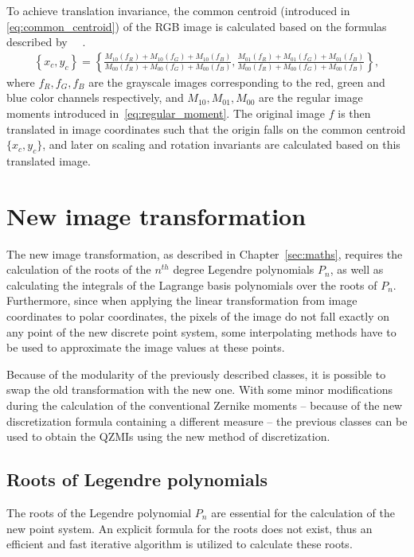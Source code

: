 To achieve translation invariance, the common centroid (introduced in \eqref{eq:common_centroid}) of the RGB image is calculated based on the formulas described by ~\citeauthor{affine_color}~\cite{affine_color}.
\begin{gather*}
    \left\{x_c,y_c\right\} = \left\{\frac{M_{10}(f_R)+M_{10}(f_G)+M_{10}(f_B)}{M_{00}(f_R)+M_{00}(f_G)+M_{00}(f_B)}, \frac{M_{01}(f_R)+M_{01}(f_G)+M_{01}(f_B)}{M_{00}(f_R)+M_{00}(f_G)+M_{00}(f_B)}\right\},
\end{gather*}
where $f_R, f_G, f_B$ are the grayscale images corresponding to the red, green and blue color channels respectively, and $M_{10}, M_{01}, M_{00}$ are the regular image moments introduced in~\eqref{eq:regular_moment}.
The original image $f$ is then translated in image coordinates such that the origin falls on the common centroid $\{x_c,y_c\}$, and later on scaling and rotation invariants are calculated based on this translated image.


\section{New image transformation}\label{sec:new_trans}
The new image transformation, as described in Chapter~\ref{sec:maths}, requires the calculation of the roots of the $n^{th}$ degree Legendre polynomials $P_n$, as well as calculating the integrals of the Lagrange basis polynomials over the roots of $P_n$. Furthermore, since when applying the linear transformation from image coordinates to polar coordinates, the pixels of the image do not fall exactly on any point of the new discrete point system, some interpolating methods have to be used to approximate the image values at these points.

Because of the modularity of the previously described classes, it is possible to swap the old transformation with the new one. With some minor modifications during the calculation of the conventional Zernike moments -- because of the new discretization formula containing a different measure -- the previous classes can be used to obtain the QZMIs using the new method of discretization.

\subsection{Roots of Legendre polynomials}
The roots of the Legendre polynomial $P_n$ are essential for the calculation of the new point system. An explicit formula for the roots does not exist, thus an efficient and fast iterative algorithm is utilized to calculate these roots.

